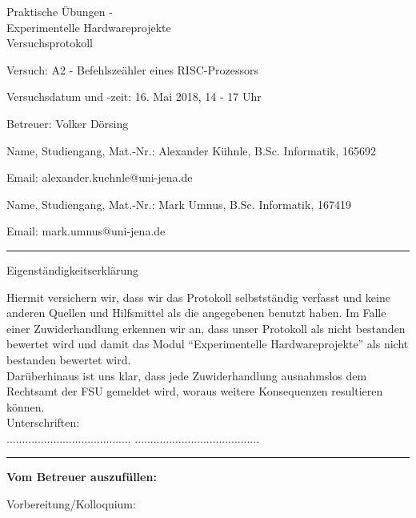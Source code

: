 \documentclass[12pt,a4paper]{scrartcl}
\begin{document}
\thispagestyle{empty}

\begin{center}
  \LARGE
  Praktische \"Ubungen - \\
  Experimentelle Hardwareprojekte \\
  \bigskip
  \Large
  Versuchsprotokoll
\end{center}

\vspace{1em}
Versuch: A2 - Befehlsze\"ahler eines RISC-Prozessors

Versuchsdatum und -zeit: 16. Mai 2018, 14 - 17 Uhr

Betreuer: Volker D\"orsing

\vspace{1em}
Name, Studiengang, Mat.-Nr.: Alexander K\"uhnle, B.Sc. Informatik, 165692

Email: alexander.kuehnle@uni-jena.de

\vspace{1em}
Name, Studiengang, Mat.-Nr.: Mark Umnus, B.Sc. Informatik, 167419

Email: mark.umnus@uni-jena.de

\vspace*{1cm}
\hrule
\vspace*{1cm}
{\Large  Eigenst\"andigkeitserkl\"arung }

Hiermit versichern wir, dass wir das Protokoll selbstst\"andig verfasst
und keine anderen Quellen und Hilfsmittel als die angegebenen benutzt
haben. Im Falle einer Zuwiderhandlung erkennen wir an, dass unser Protokoll
als nicht bestanden bewertet wird und damit das Modul ``Experimentelle
Hardwareprojekte'' als nicht bestanden bewertet wird. \\
Dar\"uberhinaus ist uns klar, dass jede Zuwiderhandlung ausnahmslos dem
Rechtsamt der FSU gemeldet wird, woraus weitere Konsequenzen resultieren
k\"onnen. \\

Unterschriften: \\
\hspace*{4cm} ........................................
\hspace{2cm} ........................................  \\

\hrule

\vspace*{0.3cm}
\textbf{Vom Betreuer auszuf\"ullen:}

Vorbereitung/Kolloquium:
\end{document}
